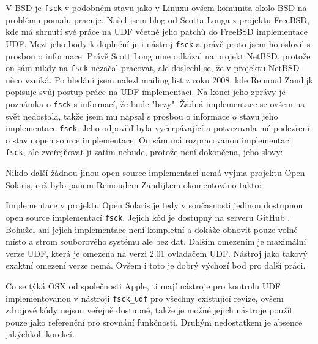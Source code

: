 V BSD je \texttt{fsck} v podobném stavu jako v Linuxu ovšem komunita okolo BSD na problému pomalu pracuje. Našel jsem blog \cite{scottuvblog} od Scotta Longa z projektu FreeBSD, kde má shrnutí své práce na UDF včetně jeho patchů do FreeBSD implementace UDF. Mezi jeho body k doplnění je i nástroj \texttt{fsck} a právě proto jsem ho oslovil s prosbou o informace. Právě Scott Long mne odkázal na projekt NetBSD, protože on sám nikdy na \texttt{fsck} nezačal pracovat, ale doslechl se, že v projektu NetBSD něco vzniká. Po hledání jsem nalezl mailing list z roku 2008, kde Reinoud Zandijk popisuje svůj postup práce na UDF implementaci. Na konci jeho zprávy je poznámka o \texttt{fsck} s informací, že bude "brzy". Žádná implementace se ovšem na svět nedostala, takže jsem mu napsal s prosbou o informace o  stavu jeho implementace \texttt{fsck}. Jeho odpověď byla vyčerpávající a potvrzovala mé podezření o stavu open source implementace. On sám má rozpracovanou implementaci \texttt{fsck}, ale zveřejňovat ji zatím nebude, protože není dokončena, jeho slovy: 
\begin{quote} 
\end{quote} 
Nikdo další žádnou jinou open source implementaci nemá vyjma projektu Open Solaris, což bylo panem Reinoudem Zandijkem okomentováno takto:
\begin{quote}
\end{quote}
Implementace v projektu Open Solaris je tedy v současnosti jedinou dostupnou open source implementací \texttt{fsck}. Jejich kód je dostupný na serveru GitHub \cite{solaris-github}. Bohužel ani jejich implementace není kompletní a dokáže obnovit pouze volné místo a strom souborového systému ale bez dat. Dalším omezením je maximální verze UDF, která je omezena na verzi 2.01 ovladačem UDF. Nástroj jako takový exaktní omezení verze nemá. Ovšem i toto je dobrý výchozí bod pro další práci.

Co se týká OSX od společnosti Apple, ti mají nástroje pro kontrolu UDF implementovanou v nástroji \texttt{fsck\_udf} pro všechny existující revize, ovšem zdrojové kódy nejsou veřejně dostupné, takže je možné jejich nástroje použít pouze jako referenční pro srovnání funkčnosti. Druhým nedostatkem je absence jakýchkoli korekcí.


